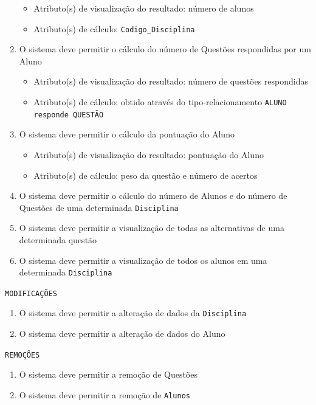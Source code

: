 \documentclass[12pt,a4paper]{article}
\begin{document}
\begin{enumerate}
        \begin{itemize}
            \item Atributo(s) de visualização do resultado: número de alunos
            \item Atributo(s) de cálculo: \texttt{Codigo\_Disciplina}
        \end{itemize}
    \item O sistema deve permitir o cálculo do número de Questões respondidas por um Aluno
        \begin{itemize}
            \item Atributo(s) de visualização do resultado: número de questões respondidas
            \item Atributo(s) de cálculo: obtido através do tipo-relacionamento \texttt{ALUNO responde QUESTÃO}
        \end{itemize}
    \item O sistema deve permitir o cálculo da pontuação do Aluno
        \begin{itemize}
            \item Atributo(s) de visualização do resultado: pontuação do Aluno
            \item Atributo(s) de cálculo: peso da questão e número de acertos
        \end{itemize}
    \item O sistema deve permitir o cálculo do número de Alunos e do número de Questões de uma determinada \texttt{Disciplina}
    \item O sistema deve permitir a visualização de todas as alternativas de uma determinada questão
    \item O sistema deve permitir a visualização de todos os alunos em uma determinada \texttt{Disciplina}
\end{enumerate}


\vspace{0.5cm}
\begin{center}
    \texttt{MODIFICAÇÕES}
\end{center}
\begin{enumerate}
    \item O sistema deve permitir a alteração de dados da \texttt{Disciplina}
    \item O sistema deve permitir a alteração de dados do Aluno
\end{enumerate}

\vspace{0.5cm}
\begin{center}
    \texttt{REMOÇÕES}
\end{center}
\begin{enumerate}
    \item O sistema deve permitir a remoção de Questões
    \item O sistema deve permitir a remoção de \texttt{Alunos}
\end{enumerate}
\end{document}
